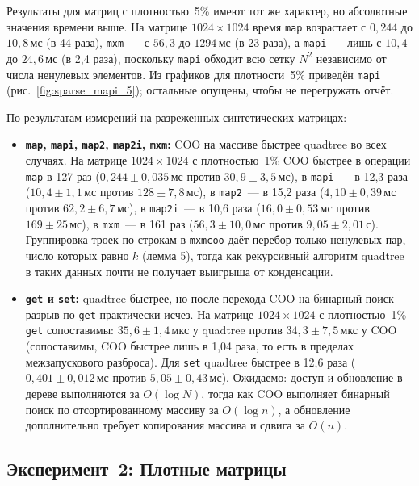 \documentclass[a4paper]{article}
\begin{document}
Результаты для матриц с плотностью~5\% имеют тот же характер, но абсолютные значения времени выше. На матрице $1024\times1024$ время \texttt{map} возрастает с $0{,}244$ до $10{,}8$\,мс (в 44 раза), \texttt{mxm}~--- с $56{,}3$ до $1294$\,мс (в 23 раза), а \texttt{mapi}~--- лишь с $10{,}4$ до $24{,}6$\,мс (в 2{,}4 раза), поскольку \texttt{mapi} обходит всю сетку $N^2$ независимо от числа ненулевых элементов. Из графиков для плотности~5\% приведён \texttt{mapi} (рис.~\ref{fig:sparse_mapi_5}); остальные опущены, чтобы не перегружать отчёт.

По результатам измерений на разреженных синтетических матрицах:
\begin{itemize}
    \item \textbf{\texttt{map}, \texttt{mapi}, \texttt{map2}, \texttt{map2i}, \texttt{mxm}:} COO на массиве быстрее quadtree во всех случаях. На матрице $1024\times1024$ с плотностью~1\% COO быстрее в операции \texttt{map} в 127 раз ($0{,}244 \pm 0{,}035$\,мс против $30{,}9 \pm 3{,}5$\,мс), в \texttt{mapi}~--- в 12,3 раза ($10{,}4 \pm 1{,}1$\,мс против $128 \pm 7{,}8$\,мс), в \texttt{map2}~--- в 15,2 раза ($4{,}10 \pm 0{,}39$\,мс против $62{,}2 \pm 6{,}7$\,мс), в \texttt{map2i}~--- в 10,6 раза ($16{,}0 \pm 0{,}53$\,мс против $169 \pm 25$\,мс), в \texttt{mxm}~--- в 161 раз ($56{,}3 \pm 10{,}0$\,мс против $9{,}05 \pm 2{,}01$\,с). Группировка троек по строкам в \texttt{mxmcoo} даёт перебор только ненулевых пар, число которых равно $k$ (лемма 5), тогда как рекурсивный алгоритм quadtree в таких данных почти не получает выигрыша от конденсации.
    \item \textbf{\texttt{get} и \texttt{set}:} quadtree быстрее, но после перехода COO на бинарный поиск разрыв по \texttt{get} практически исчез. На матрице $1024\times1024$ с плотностью~1\% \texttt{get} сопоставимы: $35{,}6 \pm 1{,}4$\,мкс у quadtree против $34{,}3 \pm 7{,}5$\,мкс у COO (сопоставимы, COO быстрее лишь в 1,04 раза, то есть в пределах межзапускового разброса). Для \texttt{set} quadtree быстрее в 12,6 раза ($0{,}401 \pm 0{,}012$\,мс против $5{,}05 \pm 0{,}43$\,мс). Ожидаемо: доступ и обновление в дереве выполняются за $O(\log N)$, тогда как COO выполняет бинарный поиск по отсортированному массиву за $O(\log n)$, а обновление дополнительно требует копирования массива и сдвига за $O(n)$.
\end{itemize}

\subsection{Эксперимент~2: Плотные матрицы}
\end{document}
